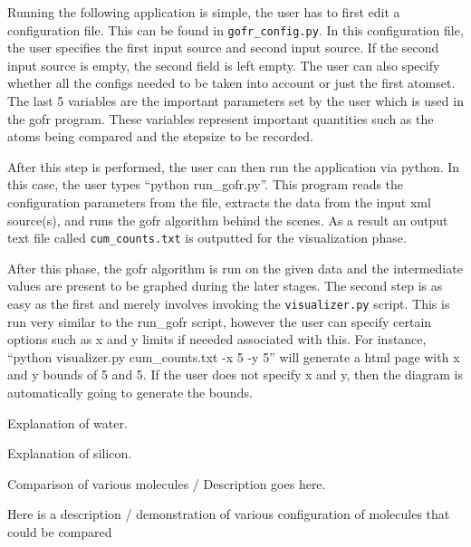 Running the following application is simple, the user has to first edit a configuration file. This can be found in \verb|gofr_config.py|. In this configuration file, the user specifies the first input source and second input source. If the second input source is empty, the second field is left empty. The user can also specify whether all the configs needed to be taken into account or just the first atomset. The last 5 variables are the important parameters set by the user which is used in the gofr program. These variables represent important quantities such as the atoms being compared and the stepsize to be recorded.




After this step is performed, the user can then run the application via python. In this case, the user types ``python run_gofr.py''. This program reads the configuration parameters from the file, extracts the data from the input xml source(s), and runs the gofr algorithm behind the scenes. As a result an output text file called \verb|cum_counts.txt| is outputted for the visualization phase.





After this phase, the gofr algorithm is run on the given data and the intermediate values are present to be graphed during the later stages. The second step is as easy as the first and merely involves invoking the \verb|visualizer.py| script. This is run very similar to the run_gofr script, however the user can specify certain options such as x and y limits if neeeded associated with this. For instance, ``python visualizer.py cum_counts.txt -x 5 -y 5'' will generate a html page with x and y bounds of 5 and 5. If the user does not specify x and y, then the diagram is automatically going to generate the bounds. 






Explanation of water.


Explanation of silicon.


Comparison of various molecules / Description goes here.



Here is a description / demonstration of various configuration of molecules that could be compared